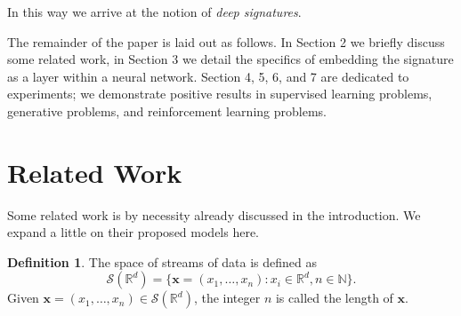 \documentclass{article}
\theoremstyle{plain}
\theoremstyle{definition}
\newtheorem{definition}[thm]{Definition}
\begin{document}
	In this way we arrive at the notion of \emph{deep signatures}.  %
	
	The remainder of the paper is laid out as follows. In Section 2 we briefly discuss some related work, in Section 3 we detail the specifics of embedding the signature as a layer within a neural network. Section 4, 5, 6, and 7 are dedicated to experiments; we demonstrate positive results in supervised learning problems, generative problems, and reinforcement learning problems.
	\section{Related Work}
	Some related work is by necessity already discussed in the introduction. We expand a little on their proposed models here.
	
	\begin{definition}
		The space of streams of data is defined as
		\begin{equation*}
		\mathcal S(\mathbb R^d) = \{ \mathbf x=(x_1, \ldots, x_n) : x_i \in \mathbb R^d, n \in \mathbb N\}.
		\end{equation*}
		Given $\mathbf x=(x_1, \ldots, x_n) \in \mathcal S(\mathbb R^d)$, the integer $n$ is called the length of $\mathbf x$.
	\end{definition}
	
\end{document}
